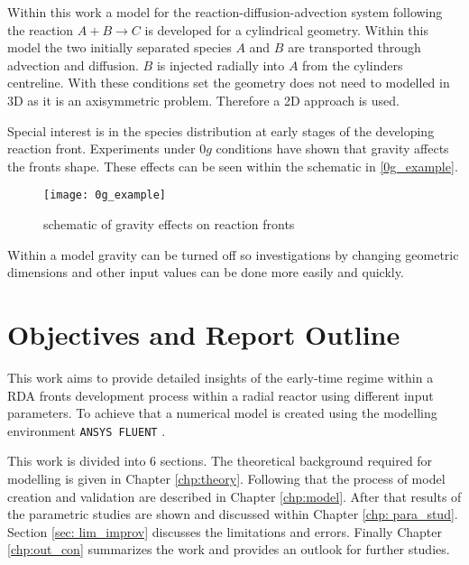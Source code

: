 \documentclass[../thesis.tex]{subfiles}
\begin{document}
Within this work a model for the reaction-diffusion-advection system following the reaction $ A+B \rightarrow C$ is developed for a cylindrical geometry. Within this model the two initially separated species $A$ and $B$ are transported through advection and diffusion. $B$ is injected radially into $A$ from the cylinders centreline. With these conditions set the geometry does not need to modelled in 3D as it is an axisymmetric problem. Therefore a 2D approach is used.

Special interest is in the species distribution at early stages of the developing reaction front. Experiments under $0g$ conditions \cite{stergiou2022effects} have shown that gravity affects the fronts shape. These effects can be seen within the schematic in \autoref{0g_example}.
\begin{figure}[htbp]
	\centering
	\texttt{[image: 0g\_example]}
	\caption{schematic of gravity effects on reaction fronts \cite{stergiou2022effects}}
	\label{fig: 0g_example}
\end{figure}
Within a model gravity can be turned off so investigations by changing geometric dimensions and other input values can be done more easily and quickly.

\section{Objectives and Report Outline}

This work aims to provide detailed insights of the early-time regime within a RDA fronts development process within a radial reactor using different input parameters. To achieve that a numerical model is created using the modelling environment \texttt{ANSYS FLUENT} \cite{manual2009ansys}. 

This work is divided into 6 sections. The theoretical background required for modelling is given in Chapter \ref{chp:theory}. Following that the process of model creation and validation are described in Chapter \ref{chp:model}. After that results of the parametric studies are shown and discussed within Chapter \ref{chp: para_stud}. Section \ref{sec: lim_improv} discusses the limitations and errors. Finally Chapter \ref{chp:out_con} summarizes the work and provides an outlook for further studies. 
\end{document}
